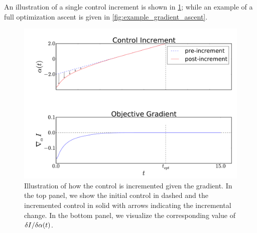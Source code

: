 An illustration of a single control increment is shown in
\cref{fig:example_control_increment}; while an example of a full optimization ascent is given in \cref{fig:example_gradient_ascent}.

\begin{figure}[htp] 
\begin{center}
  \includegraphics[width=\textwidth]{Figs/FP_Adjoint/control_increment_example.pdf}
  \caption[Single control Increment Illustration]{Illustration of how the
  control is incremented given the gradient. In the top panel, we show the
  initial control in dashed and the incremented control in solid with arrows
  indicating the incremental change. In the bottom panel, we visualize the
  corresponding value of $\delta I/ \delta \alpha (t)$. }
  \label{fig:example_control_increment}    
\end{center}
\end{figure}   
           
